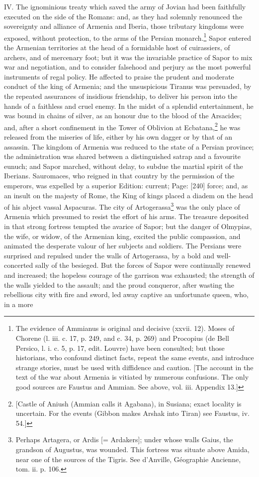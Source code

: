IV. The ignominious treaty which saved the army of Jovian had been faithfully executed on the side of the Romans: and, as they had solemnly renounced the sovereignty and alliance of Armenia and Iberia, those tributary kingdoms were exposed, without protection, to the arms of the Persian monarch.\footnote{The evidence of Ammianus is original and decisive (xxvii. 12). Moses of Chorene (l. iii. c. 17, p. 249, and c. 34, p. 269) and Procopius (de Bell Persico, l. i. c. 5, p. 17, edit. Louvre) have been consulted; but those historians, who confound distinct facts, repeat the same events, and introduce strange stories, must be used with diffidence and caution. [The account in the text of the war about Armenia is vitiated by numerous confusions. The only good sources are Faustus and Ammian. See above, vol. iii. Appendix 13.]} Sapor entered the Armenian territories at the head of a formidable host of cuirassiers, of archers, and of mercenary foot; but it was the invariable practice of Sapor to mix war and negotiation, and to consider falsehood and perjury as the most powerful instruments of regal policy. He affected to praise the prudent and moderate conduct of the king of Armenia; and the unsuspicious Tiranus was persuaded, by the repeated assurances of insidious friendship, to deliver his person into the hands of a faithless and cruel enemy. In the midst of a splendid entertainment, he was bound in chains of silver, as an honour due to the blood of the Arsacides; and, after a short confinement in the Tower of Oblivion at Ecbatana,\footnote{[Castle of Aniush (Ammian calls it Agabana), in Susiana; exact locality is uncertain. For the events (Gibbon makes Arshak into Tiran) see Faustus, iv. 54.]} he was released from the miseries of life, either by his own dagger or by that of an assassin. The kingdom of Armenia was reduced to the state of a Persian province; the administration was shared between a distinguished satrap and a favourite eunuch; and Sapor marched, without delay, to subdue the martial spirit of the Iberians. Sauromaces, who reigned in that country by the permission of the emperors, was expelled by a superior Edition: current; Page: [240] force; and, as an insult on the majesty of Rome, the King of kings placed a diadem on the head of his abject vassal Aspacuras. The city of Artogerassa\footnote{Perhaps Artagera, or Ardis [= Ardakers]; under whose walls Gaius, the grandson of Augustus, was wounded. This fortress was situate above Amida, near one of the sources of the Tigris. See d\texthebrew{}’Anville, Géographie Ancienne, tom. ii. p. 106.} was the only place of Armenia which presumed to resist the effort of his arms. The treasure deposited in that strong fortress tempted the avarice of Sapor; but the danger of Olmypias, the wife, or widow, of the Armenian king, excited the public compassion, and animated the desperate valour of her subjects and soldiers. The Persians were surprised and repulsed under the walls of Artogerassa, by a bold and well-concerted sally of the besieged. But the forces of Sapor were continually renewed and increased; the hopeless courage of the garrison was exhausted; the strength of the walls yielded to the assault; and the proud conqueror, after wasting the rebellious city with fire and sword, led away captive an unfortunate queen, who, in a more 